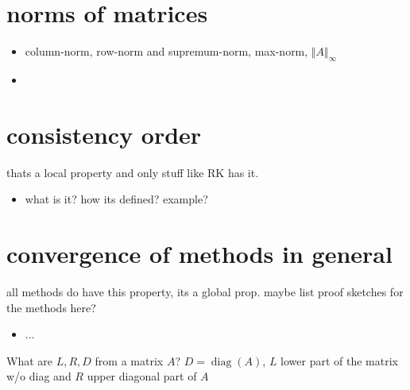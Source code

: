 \documentclass[]{scrartcl}
\newcommand{\<}{\trianglelefteq}
\newcommand{\norm}[2]{\Vert #1 \Vert_{#2}}
\DeclareMathOperator{\diag}{diag}
\begin{document}
\section*{norms of matrices}
\begin{itemize}
	\item column-norm, row-norm and supremum-norm, max-norm, $\norm{A}{\infty}$
	\item 
\end{itemize}

\section*{consistency order}
thats a local property and only stuff like RK has it.
\begin{itemize}
	\item what is it? how its defined? example?
\end{itemize}

\section*{convergence of methods in general}
all methods do have this property, its a global prop. maybe list proof sketches for the methods here?
\begin{itemize}
	\item ...
\end{itemize}

What are $L,R,D$ from a matrix $A$?
$D = \diag(A)$, $L$ lower part of the matrix w/o diag and $R$ upper diagonal part of $A$ 
\end{document}
